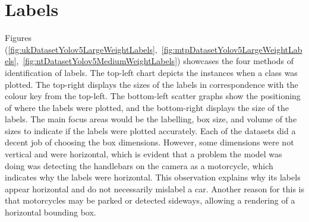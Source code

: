 \documentclass[12pt]{report} %
\begin{document}
	\section{Labels}
		Figures (\ref{fig:ukDatasetYolov5LargeWeightLabels},~\ref{fig:mtpDatasetYolov5LargeWeightLabels},~\ref{fig:ntDatasetYolov5MediumWeightLabels}) showcases the four methods of identification of labels. The top-left chart depicts the instances when a class was plotted. The top-right displays the sizes of the labels in correspondence with the colour key from the top-left. The bottom-left scatter graphs show the positioning of where the labels were plotted, and the bottom-right displays the size of the labels. The main focus areas would be the labelling, box size, and volume of the sizes to indicate if the labels were plotted accurately. Each of the datasets did a decent job of choosing the box dimensions. However, some dimensions were not vertical and were horizontal, which is evident that a problem the model was doing was detecting the handlebars on the camera as a motorcycle, which indicates why the labels were horizontal. This observation explains why its labels appear horizontal and do not necessarily mislabel a car. Another reason for this is that motorcycles may be parked or detected sideways, allowing a rendering of a horizontal bounding box.
\end{document}
